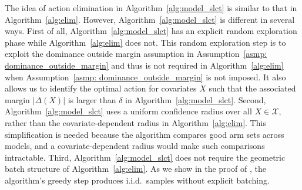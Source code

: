 \documentclass[mnsc]{informs3aa} %
\newcommand{\mX}{\mathcal X}
\newcommand{\mH}{\mathcal H}
\begin{document}
The idea of action elimination in Algorithm~\ref{alg:model_slct} is similar to that in Algorithm~\ref{alg:elim}. However, Algorithm~\ref{alg:model_slct} is different in several ways. First of all, Algorithm~\ref{alg:model_slct} has an explicit random exploration phase while Algorithm~\ref{alg:elim} does not. This random exploration step is to exploit the dominance outside margin assumption in Assumption~\ref{asmp: dominance_outside_margin} and thus is not required in Algorithm~\ref{alg:elim} when Assumption~\ref{asmp: dominance_outside_margin}  is not imposed. It also allows us to identify the optimal action for covariates $X$ such that the associated margin $|\Delta(X)|$ is larger than $\delta$ in Algorithm~\ref{alg:model_slct}.
Second, Algorithm~\ref{alg:model_slct} uses a uniform confidence radius over all $X\in\mX,$ rather than the covariate-dependent radius in Algorithm~\ref{alg:elim}. This simplification is needed because the algorithm compares good arm sets across models, and a covariate-dependent radius would make such comparisons intractable.
Third, Algorithm~\ref{alg:model_slct} does not require the geometric batch structure of Algorithm~\ref{alg:elim}. As we show in the proof of , the algorithm's greedy step produces i.i.d.\ samples without explicit batching.



\end{document}
